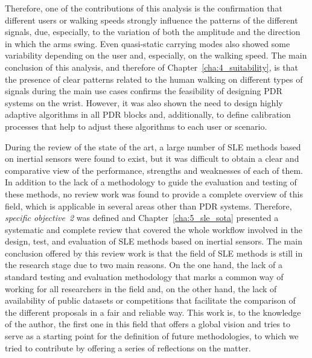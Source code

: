 Therefore, one of the contributions of this analysis is the confirmation that different users or walking speeds strongly influence the patterns of the different signals, due, especially, to the variation of both the amplitude and the direction in which the arms swing. 
Even quasi-static carrying modes also showed some variability depending on the user and, especially, on the walking speed.
The main conclusion of this analysis, and therefore of Chapter~\ref{cha:4_suitability}, is that the presence of clear patterns related to the human walking on different types of signals during the main use cases confirms the feasibility of designing PDR systems on the wrist. 
However, it was also shown the need to design highly adaptive algorithms in all PDR blocks and, additionally, to define calibration processes that help to adjust these algorithms to each user or scenario.

During the review of the state of the art, a large number of SLE methods based on inertial sensors were found to exist, but it was difficult to obtain a clear and comparative view of the performance, strengths and weaknesses of each of them.
In addition to the lack of a methodology to guide the evaluation and testing of these methods, no review work was found to provide a complete overview of this field, which is applicable in several areas other than PDR systems.
Therefore, \emph{specific objective~2} was defined and Chapter~\ref{cha:5_sle_sota} presented a systematic and complete review that covered the whole workflow involved in the design, test, and evaluation of SLE methods based on inertial sensors.
The main conclusion offered by this review work is that the field of SLE methods is still in the research stage due to two main reasons. On the one hand, the lack of a standard testing and evaluation methodology that marks a common way of working for all researchers in the field and, on the other hand, the lack of availability of public datasets or competitions that facilitate the comparison of the different proposals in a fair and reliable way.
This work is, to the knowledge of the author, the first one in this field that offers a global vision and tries to serve as a starting point for the definition of future methodologies, to which we tried to contribute by offering a series of reflections on the matter.

